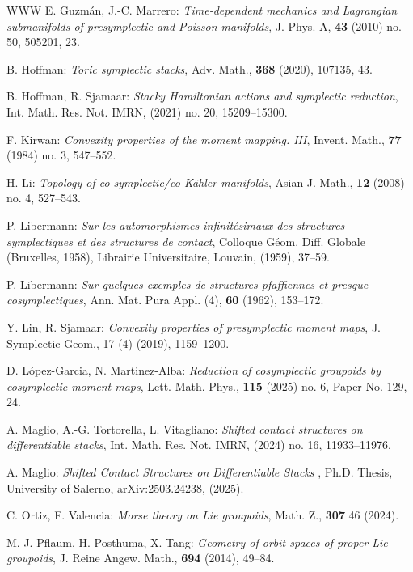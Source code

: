 \documentclass[
  a4paper, 
  reqno, 
  oneside, 
  12pt
]{amsart}
\theoremstyle{definition}
\theoremstyle{remark}
\begin{document}
\begin{thebibliography}{WWW}
 E. Guzm\'{a}n, J.-C. Marrero: \emph{Time-dependent mechanics and {L}agrangian submanifolds of presymplectic and {P}oisson manifolds}, J. Phys. A, {\bf 43} (2010) no. 50, 505201, 23.

 B. Hoffman: \emph{Toric symplectic stacks}, Adv. Math., {\bf 368} (2020), 107135, 43.
	
 B. Hoffman, R. Sjamaar: \emph{Stacky {H}amiltonian actions and symplectic reduction}, Int. Math. Res. Not. IMRN,  (2021) no. 20, 15209--15300.

 F. Kirwan: \emph{Convexity properties of the moment mapping. {III}}, Invent. Math., {\bf 77}  (1984) no. 3, 547--552.

 H. Li: \emph{Topology of co-symplectic/co-{K}\"{a}hler manifolds}, Asian J. Math., {\bf 12} (2008) no. 4, 527--543.

 P. Libermann: \emph{Sur les automorphismes infinit\'{e}simaux des structures symplectiques et des structures de contact}, Colloque {G}\'{e}om. {D}iff. {G}lobale ({B}ruxelles, 1958), Librairie Universitaire, Louvain, (1959), 37--59.


 P. Libermann: \emph{Sur quelques exemples de structures pfaffiennes et presque cosymplectiques}, Ann. Mat. Pura Appl. (4), {\bf 60} (1962), 153--172.

 Y. Lin, R. Sjamaar:  {\it Convexity properties of presymplectic moment maps}, J. Symplectic Geom.,  17 (4) (2019), 1159--1200.

 D. L\'opez-Garcia, N. Martinez-Alba: \emph{Reduction of cosymplectic groupoids by cosymplectic moment maps}, Lett. Math. Phys., {\bf 115} (2025) no. 6, Paper No. 129, 24.

 A. Maglio, A.-G. Tortorella, L. Vitagliano: \emph{Shifted contact structures on differentiable stacks}, Int. Math. Res. Not. IMRN, (2024) no. 16, 11933--11976.


 A. Maglio: \emph{Shifted Contact Structures on Differentiable Stacks }, Ph.D. Thesis, University of Salerno, arXiv:2503.24238, (2025).

 C. Ortiz, F. Valencia: \emph{Morse theory on {L}ie groupoids}, Math. Z., {\bf 307} 46 (2024).

 M. J. Pflaum, H. Posthuma, X. Tang: \emph{Geometry of orbit spaces of proper {L}ie groupoids}, J. Reine Angew. Math., {\bf 694} (2014), 49--84.



	

\end{thebibliography}
\end{document}
